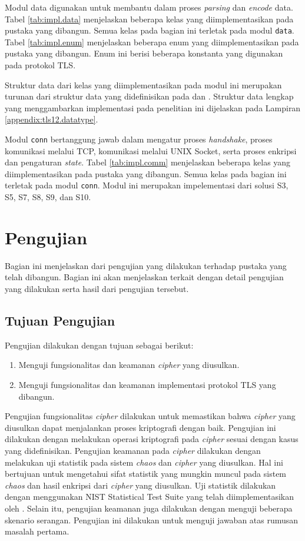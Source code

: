 Modul data digunakan untuk membantu dalam proses \emph{parsing} dan \emph{encode} data. Tabel \ref{tab:impl.data} menjelaskan beberapa kelas yang diimplementasikan pada pustaka yang dibangun. Semua kelas pada bagian ini terletak pada modul \texttt{data}. Tabel \ref{tab:impl.enum} menjelaskan beberapa enum yang diimplementasikan pada pustaka yang dibangun. Enum ini berisi beberapa konstanta yang digunakan pada protokol TLS.

Struktur data dari kelas yang diimplementasikan pada modul ini merupakan turunan dari struktur data yang didefinisikan pada \textcite{rfc5246} dan \textcite{rfc4492}. Struktur data lengkap yang menggambarkan implementasi pada penelitian ini dijelaskan pada Lampiran \ref{appendix:tls12.datatype}.

Modul \texttt{conn} bertanggung jawab dalam mengatur proses \emph{handshake}, proses komunikasi melalui TCP, komunikasi melalui UNIX Socket, serta proses enkripsi dan pengaturan \emph{state}. Tabel \ref{tab:impl.comm} menjelaskan beberapa kelas yang diimplementasikan pada pustaka yang dibangun. Semua kelas pada bagian ini terletak pada modul \texttt{conn}. Modul ini merupakan impelementasi dari solusi S3, S5, S7, S8, S9, dan S10.

\section{Pengujian}
Bagian ini menjelaskan dari pengujian yang dilakukan terhadap pustaka yang telah dibangun. Bagian ini akan menjelaskan terkait dengan detail pengujian yang dilakukan serta hasil dari pengujian tersebut.

\subsection{Tujuan Pengujian}
Pengujian dilakukan dengan tujuan sebagai berikut:
\begin{enumerate}
  \item Menguji fungsionalitas dan keamanan \emph{cipher} yang diusulkan.
  \item Menguji fungsionalitas dan keamanan implementasi protokol TLS yang dibangun.
\end{enumerate}

Pengujian fungsionalitas \emph{cipher} dilakukan untuk memastikan bahwa \emph{cipher} yang diusulkan dapat menjalankan proses kriptografi dengan baik. Pengujian ini dilakukan dengan melakukan operasi kriptografi pada \emph{cipher} sesuai dengan kasus yang didefinisikan. Pengujian keamanan pada \emph{cipher} dilakukan dengan melakukan uji statistik pada sistem \emph{chaos} dan \emph{cipher} yang diusulkan. Hal ini bertujuan untuk mengetahui sifat statistik yang mungkin muncul pada sistem \emph{chaos} dan hasil enkripsi dari \emph{cipher} yang diusulkan. Uji statistik dilakukan dengan menggunakan NIST Statistical Test Suite yang telah diimplementasikan oleh \textcite{marek2016}. Selain itu, pengujian keamanan juga dilakukan dengan menguji beberapa skenario serangan. Pengujian ini dilakukan untuk menguji jawaban atas rumusan masalah pertama.

